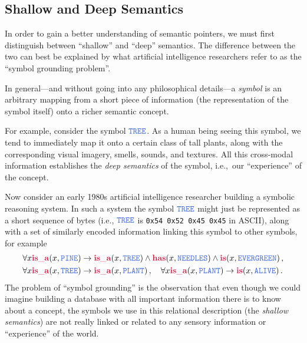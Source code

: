 \documentclass[10pt,letterpaper,oneside]{article}
\newcommand{\Pred}[1]{\ensuremath{\mathbf{\textcolor{Crimson}{#1}}}}
\newcommand{\Obj}[1]{\ensuremath{\mathtt{\textcolor{RoyalBlue}{#1}}}}
\begin{document}
\subsection{Shallow and Deep Semantics}

In order to gain a better understanding of semantic pointers, we must first distinguish between \enquote{shallow} and \enquote{deep} semantics. The difference between the two can best be explained by what artificial intelligence researchers refer to as the \enquote{symbol grounding problem}.

In general---and without going into any philosophical details---a \emph{symbol} is an arbitrary mapping from a short piece of information (the representation of the symbol itself) onto a richer semantic concept.

For example, consider the symbol {\Obj{TREE}}. As a human being seeing this symbol, we tend to immediately map it onto a certain class of tall plants, along with the corresponding visual imagery, smells, sounds, and textures. All this cross-modal information establishes the \emph{deep semantics} of the symbol, i.e.,~our \enquote{experience} of the concept.

Now consider an early 1980s artificial intelligence researcher building a symbolic reasoning system. In such a system the symbol {\Obj{TREE}} might just be represented as a short sequence of bytes (i.e., \Obj{TREE} is \texttt{0x54 0x52 0x45 0x45} in ASCII), along with a set of similarly encoded information linking this symbol to other symbols, for example
\begin{align*}
	\forall x \Pred{is\_a}(x, \Obj{PINE}) &\rightarrow \Pred{is\_a}(x, \Obj{TREE}) \wedge \Pred{has}(x, \Obj{NEEDLES}) \wedge \Pred{is}(x, \Obj{EVERGREEN}) \,, \\
	\forall x \Pred{is\_a}(x, \Obj{TREE}) &\rightarrow \Pred{is\_a}(x, \Obj{PLANT}) \,, \quad \forall x \Pred{is\_a}(x, \Obj{PLANT}) \rightarrow \Pred{is}(x, \Obj{ALIVE}) \,.
\end{align*}
The problem of \enquote{symbol grounding} is the observation that even though we could imagine building a database with all important information there is to know about a concept, the symbols we use in this relational description (the \emph{shallow semantics}) are not really linked or related to any sensory information or \enquote{experience} of the world.

\end{document}
